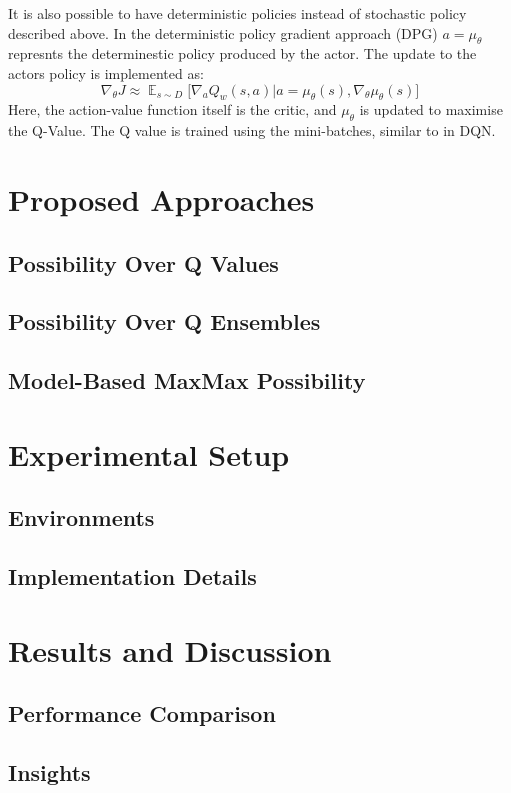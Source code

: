 \documentclass[12pt,a4paper]{report}
\DeclareMathOperator{\EX}{\mathbb{E}}
\begin{document}
It is also possible to have deterministic policies instead of stochastic policy described above. In the deterministic policy gradient approach (DPG) $a = \mu_\theta$ represnts the determinestic policy produced by the actor. The update to the actors policy is implemented as:
\[
  \nabla_\theta J \approx \EX_{s \sim D}\big[\nabla_a Q_w(s,a)\big|{a=\mu_\theta(s)} ,\nabla_\theta \mu_\theta(s)\big]
\]
Here, the action-value function itself is the critic, and $\mu_\theta$ is updated to maximise the Q-Value. The Q value is trained using the mini-batches, similar to in DQN.  


\chapter{Proposed Approaches}
\section{Possibility Over Q Values}
\section{Possibility Over Q Ensembles}
\section{Model-Based MaxMax Possibility}

\chapter{Experimental Setup}
\section{Environments}
\section{Implementation Details}

\chapter{Results and Discussion}
\section{Performance Comparison}
\section{Insights}
\end{document}
